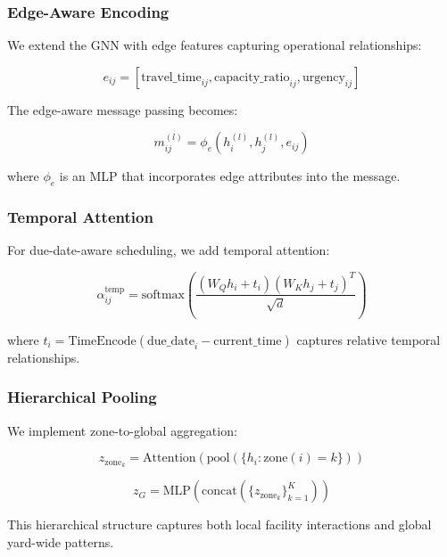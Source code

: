 \documentclass[11pt,a4paper]{article}
\begin{document}
\subsubsection{Edge-Aware Encoding}

We extend the GNN with edge features capturing operational relationships:

\begin{equation}
e_{ij} = [\text{travel\_time}_{ij}, \text{capacity\_ratio}_{ij}, \text{urgency}_{ij}]
\end{equation}

The edge-aware message passing becomes:

\begin{equation}
m_{ij}^{(l)} = \phi_e(h_i^{(l)}, h_j^{(l)}, e_{ij})
\end{equation}

where $\phi_e$ is an MLP that incorporates edge attributes into the message.

\subsubsection{Temporal Attention}

For due-date-aware scheduling, we add temporal attention:

\begin{equation}
\alpha_{ij}^{\text{temp}} = \text{softmax}\left( \frac{(W_Q h_i + t_i)(W_K h_j + t_j)^T}{\sqrt{d}} \right)
\end{equation}

where $t_i = \text{TimeEncode}(\text{due\_date}_i - \text{current\_time})$ captures relative temporal relationships.

\subsubsection{Hierarchical Pooling}

We implement zone-to-global aggregation:

\begin{equation}
z_{\text{zone}_k} = \text{Attention}\left( \text{pool}(\{h_i : \text{zone}(i) = k\}) \right)
\end{equation}

\begin{equation}
z_G = \text{MLP}\left( \text{concat}\left( \{z_{\text{zone}_k}\}_{k=1}^K \right) \right)
\end{equation}

This hierarchical structure captures both local facility interactions and global yard-wide patterns.
\end{document}
